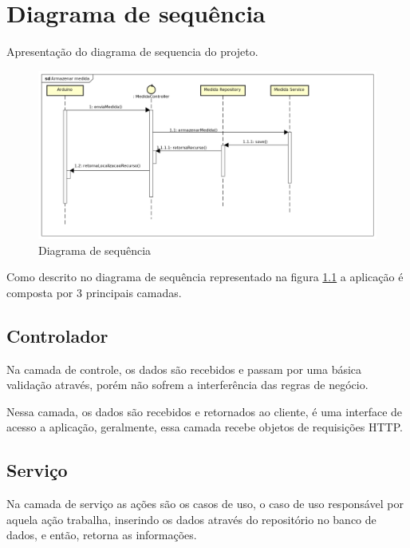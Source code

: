 \chapter{Diagrama de sequência}

Apresentação do diagrama de sequencia do projeto.

\begin{figure}[H]
    \label{figure_diagrama_sequencia}
    \centering
    \caption{Diagrama de sequência}
    \includegraphics[scale=0.40]{diagrams/sequencia.png}
    \hfill
\end{figure}

Como descrito no diagrama de sequência representado na figura \ref{figure_diagrama_sequencia} a aplicação é composta por 3 principais camadas.

\section{Controlador}

Na camada de controle, os dados são recebidos e passam por uma básica validação através, porém não sofrem a interferência das regras de negócio.

Nessa camada, os dados são recebidos e retornados ao cliente, é uma interface de acesso a aplicação, geralmente, essa camada recebe objetos de requisições HTTP.

\section{Serviço}

Na camada de serviço as ações são os casos de uso, o caso de uso responsável por aquela ação trabalha, inserindo os dados através do repositório no banco de dados, e então, retorna as informações.

